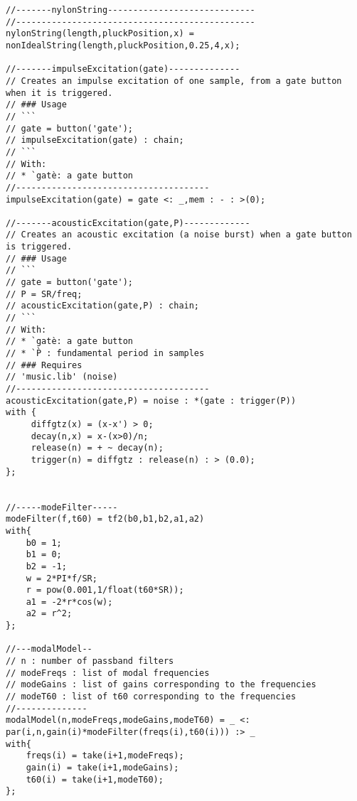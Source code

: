 \begin{lstlisting}
//-------nylonString-----------------------------
//-----------------------------------------------
nylonString(length,pluckPosition,x) = nonIdealString(length,pluckPosition,0.25,4,x);

//-------impulseExcitation(gate)--------------
// Creates an impulse excitation of one sample, from a gate button when it is triggered.
// ### Usage
// ```
// gate = button('gate');
// impulseExcitation(gate) : chain;
// ```
// With:
// * `gatè: a gate button
//--------------------------------------
impulseExcitation(gate) = gate <: _,mem : - : >(0);

//-------acousticExcitation(gate,P)-------------
// Creates an acoustic excitation (a noise burst) when a gate button is triggered.
// ### Usage
// ```
// gate = button('gate');
// P = SR/freq;
// acousticExcitation(gate,P) : chain;
// ```
// With:
// * `gatè: a gate button
// * `P̀ : fundamental period in samples
// ### Requires
// 'music.lib' (noise)
//--------------------------------------
acousticExcitation(gate,P) = noise : *(gate : trigger(P))
with {
     diffgtz(x) = (x-x') > 0;
     decay(n,x) = x-(x>0)/n;
     release(n) = + ~ decay(n);
     trigger(n) = diffgtz : release(n) : > (0.0);
};


//-----modeFilter-----
modeFilter(f,t60) = tf2(b0,b1,b2,a1,a2)
with{
	b0 = 1;
	b1 = 0;
	b2 = -1;
	w = 2*PI*f/SR;
	r = pow(0.001,1/float(t60*SR));
	a1 = -2*r*cos(w);
	a2 = r^2;
};

//---modalModel--
// n : number of passband filters
// modeFreqs : list of modal frequencies
// modeGains : list of gains corresponding to the frequencies
// modeT60 : list of t60 corresponding to the frequencies
//--------------
modalModel(n,modeFreqs,modeGains,modeT60) = _ <: par(i,n,gain(i)*modeFilter(freqs(i),t60(i))) :> _
with{
	freqs(i) = take(i+1,modeFreqs);
	gain(i) = take(i+1,modeGains);
	t60(i) = take(i+1,modeT60);
};
\end{lstlisting}
